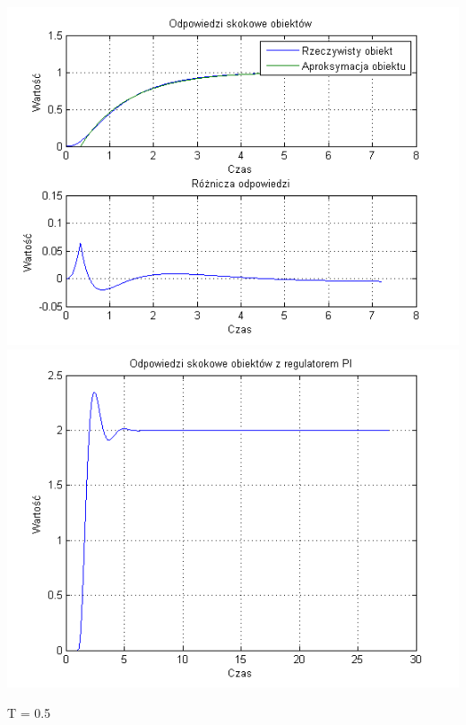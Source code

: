 \documentclass[10pt,a4paper]{article}
\begin{document}
\begin{center}
\includegraphics[scale=1]{images/jeden/skrypt_95.png}\\
\includegraphics[scale=1]{images/jeden/skrypt_96.png}\\
\end{center}
\newpage
T = 0.5
\end{document}
